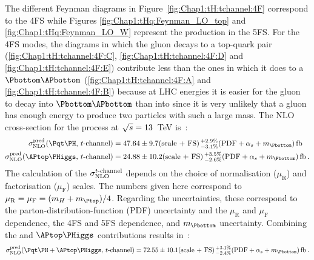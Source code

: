The different Feynman diagrams in Figure~\ref{fig:Chap1:tH:tchannel:4F} correspond to the 4FS while 
Figures \ref{fig:Chap1:tHq:Feynman_LO_top} and \ref{fig:Chap1:tHq:Feynman_LO_W} represent the \tH
production in the 5FS.
For the 4FS modes, the diagrams in which the gluon decays to a top-quark pair (\ref{fig:Chap1:tH:tchannel:4F:C}, 
\ref{fig:Chap1:tH:tchannel:4F:D} and \ref{fig:Chap1:tH:tchannel:4F:E}) contribute less 
than the ones in which it does to a $\Pbottom\APbottom$ (\ref{fig:Chap1:tH:tchannel:4F:A} and \ref{fig:Chap1:tH:tchannel:4F:B}) 
because at LHC energies it is easier for the gluon to decay into
$\Pbottom\APbottom$ than into \ttbar  since it is very unlikely that a gluon has enough
energy to produce two particles with such a large mass.
The NLO cross-section for the \tHq process at $\sqrt{s}=13$~TeV  %
is~\cite{Demartin:2015uha}:
\begin{align*}
	\sigma_{\text{NLO}}^{\text{pred}} (\tH, \,\tchannel) & = 47.64\pm 9.7\text{(scale + FS)}\,^{+2.9\%}_{-3.1\%}(\text{PDF}+\alpha_{s}+m_{\Pbottom})\,\text{fb}\\
	\sigma_{\text{NLO}}^{\text{pred}} (\APtop\PHiggs, \, \tchannel) & = 24.88 \pm 10.2\text{(scale + FS)}\,^{+3.5\%}_{-2.6\%}(\text{PDF}+\alpha_{s}+m_{\Pbottom}) \,\text{fb}\, .
\end{align*}
The calculation of the $\sigma_{\text{NLO}}^{t\text{-channel}}$ depends on the choice of normalisation ($\mu_{\text{R}}$)
and factorisation ($\mu_{\text{F}}$) scales. The numbers given here correspond to $\mu_{\text{R}} = \mu_{\text{F}} = (\mH + \mtop)/4$.
Regarding the uncertainties, these correspond to the parton-distribution-function (PDF) uncertainty and
the $\mu_{\text{R}}$ and $\mu_{\text{F}}$ dependence, the 4FS and 5FS dependence, and $m_{\Pbottom}$ uncertainty. 
Combining the \tH and $\APtop\PHiggs$ contributions results in~\cite{Demartin:2015uha}:
\begin{equation*}
	\sigma_{\text{NLO}}^{\text{pred}} (\tH + \APtop\PHiggs, \,\tchannel ) = 72.55 \pm 10.1\text{(scale + FS)}\,^{+3.1\%}_{-2.4\%}(\text{PDF}+\alpha_{s}+m_{\Pbottom})\,\text{fb}\,.
\end{equation*}



